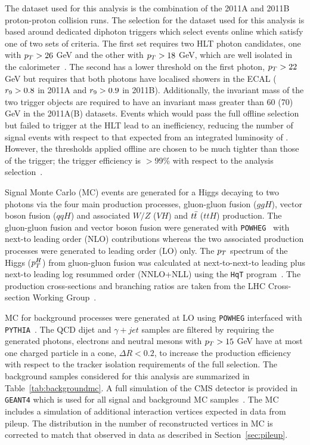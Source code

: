 The dataset used for this analysis is the combination of the 2011A and 2011B 
proton-proton collision runs.
The selection for the dataset used for this analysis is based around dedicated diphoton triggers
which select events online which satisfy one of two sets of criteria.
The first set requires two HLT photon candidates, one with $p_{T}>26$ GeV and the other with 
$p_{T}>18$ GeV, which are well isolated in the calorimeter~\citep{AN-12-048}. The second has a lower threshold on
the first photon, $p_{T}>22$ GeV but requires that both photons have localised showers in the ECAL 
($r_{9}>0.8$ in 2011A and $r_{9}>0.9$ in 2011B). 
Additionally, the invariant mass of the two trigger objects are required to have an 
invariant mass greater than 60 (70) GeV in the 2011A(B) datasets.
Events which would pass the full offline selection but failed to trigger at the HLT lead to an inefficiency, 
reducing the number of signal events with respect to that expected from an integrated luminosity of \clumi.
However, the thresholds applied offline are chosen to be much tighter than those of the trigger;
the trigger efficiency is $>$99\% with respect to the analysis selection~\citep{AN-12-048}. 

Signal Monte Carlo (MC) events are generated for a Higgs decaying to two photons via the four main 
production processes, gluon-gluon fusion ($ggH$), vector boson fusion ($qqH$) and associated $W/Z$ ($VH$) 
and $t\bar{t}$ ($ttH$) production.
The gluon-gluon fusion and vector boson fusion were generated with \texttt{POWHEG}~\citep{powheg} with 
next-to leading order (NLO) contributions whereas
the two associated production processes were generated to leading order (LO) only.
The $p_{T}$ spectrum of the Higgs ($p_{T}^{H}$) from gluon-gluon fusion was calculated at
next-to-next-to leading plus next-to leading log resummed order (NNLO+NLL) using the \texttt{HqT} program~\citep{hqt}.
The production cross-sections and branching ratios are taken from the LHC Cross-section Working Group~\citep{lhcxswg}.

MC for background processes were generated at LO using \texttt{POWHEG} interfaced with \texttt{PYTHIA}~\citep{pythia}.
The QCD dijet and $\gamma+jet$ samples are filtered by requiring the generated photons, electrons and neutral
mesons with $p_{T}>15$ GeV have at most one charged particle in a cone, $\Delta R<0.2$, to increase the 
production efficiency with respect to the tracker isolation requirements of the full selection.
The background samples considered for this analysis are summarized in Table~\ref{tab:backgroundmc}.
A full simulation of the CMS detector is provided in \texttt{GEANT4} which is used for all signal
and background MC samples~\citep{geant4}. The MC includes a simulation of additional interaction vertices expected in data
from pileup. The distribution in the number of reconstructed vertices in MC  is corrected to match that observed
in data as described in Section~\ref{sec:pileup}.

